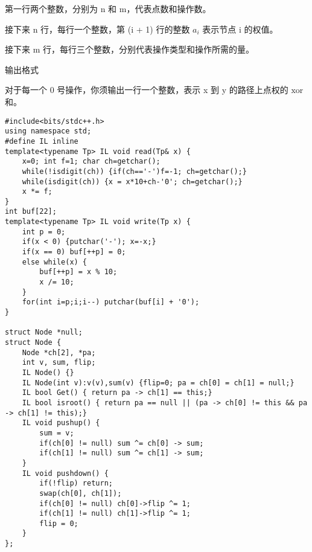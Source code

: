 \documentclass[UTF8]{ctexart}
\begin{document}
第一行两个整数，分别为 n 和 m，代表点数和操作数。

接下来 n 行，每行一个整数，第 (i + 1) 行的整数 $a_i$ 表示节点 i 的权值。

接下来 m 行，每行三个整数，分别代表操作类型和操作所需的量。

输出格式

对于每一个 0 号操作，你须输出一行一个整数，表示 x 到 y 的路径上点权的 $\text{xor}$ 和。

\begin{framed}
\begin{lstlisting}
#include<bits/stdc++.h>
using namespace std;
#define IL inline
template<typename Tp> IL void read(Tp& x) {
    x=0; int f=1; char ch=getchar();
    while(!isdigit(ch)) {if(ch=='-')f=-1; ch=getchar();}
    while(isdigit(ch)) {x = x*10+ch-'0'; ch=getchar();}
    x *= f;
}
int buf[22];
template<typename Tp> IL void write(Tp x) {
    int p = 0;
    if(x < 0) {putchar('-'); x=-x;}
    if(x == 0) buf[++p] = 0;
    else while(x) {
        buf[++p] = x % 10;
        x /= 10;
    }
    for(int i=p;i;i--) putchar(buf[i] + '0');
}

struct Node *null;
struct Node {
    Node *ch[2], *pa;
    int v, sum, flip;
    IL Node() {}
    IL Node(int v):v(v),sum(v) {flip=0; pa = ch[0] = ch[1] = null;}
    IL bool Get() { return pa -> ch[1] == this;}
    IL bool isroot() { return pa == null || (pa -> ch[0] != this && pa -> ch[1] != this);}
    IL void pushup() {
        sum = v;
        if(ch[0] != null) sum ^= ch[0] -> sum;
        if(ch[1] != null) sum ^= ch[1] -> sum;
    }
    IL void pushdown() {
        if(!flip) return;
        swap(ch[0], ch[1]);
        if(ch[0] != null) ch[0]->flip ^= 1;
        if(ch[1] != null) ch[1]->flip ^= 1;
        flip = 0;
    }
};


\end{lstlisting}
\end{framed}
\end{document}
